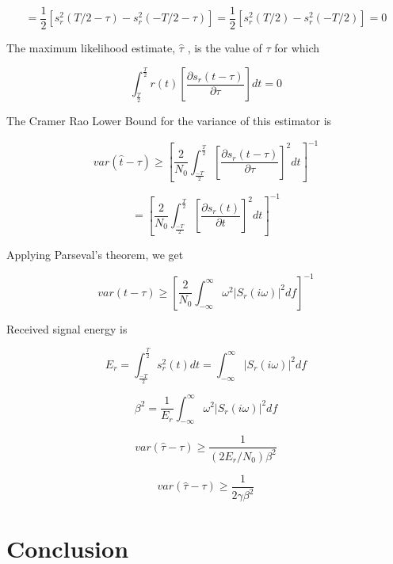 \documentclass[11pt]{article}
\begin{document}
\begin{equation}
=\frac{1}{2}[s_r^2(T/2-\tau) - s_r^2(-T/2-\tau)] = \frac{1}{2}[s_r^2(T/2) - s_r^2(-T/2)] = 0
\end{equation}

The maximum likelihood estimate, $\hat{\tau}$ , is the value of $\tau$ for which

\begin{equation}
\int^\frac{T}{2}_\frac{T}{2}
r(t)
\left[ \frac{\partial s_r(t-\tau)}{\partial \tau} \right] dt = 0
\end{equation}

The Cramer Rao Lower Bound for the variance of this estimator is

\begin{equation}
var(\hat{t} - \tau)
\geq
\left[
\frac{2}{N_0}
\int^\frac{T}{2}_\frac{-T}{2} \left[ \frac{\partial s_r(t-\tau)}{\partial \tau} \right]^2 dt \right]^{-1}
\end{equation}


\begin{equation}
= \left[ \frac{2}{N_0} \int^\frac{T}{2}_\frac{-T}{2} \left[ \frac{\partial s_r(t)}{\partial t} \right]^2 dt \right]^{-1}
\end{equation}

Applying Parseval's theorem, we get

\begin{equation}
var(t-\tau)
\geq
\left[ \frac{2}{N_0} \int^{\infty}_{-\infty} \omega^2 |S_r(i\omega )|^2 df \right]^{-1}
\end{equation}

Received signal energy is

\begin{equation}
E_r = \int^\frac{T}{2}_\frac{-T}{2} s_r^2(t)dt = \int^\infty_{-\infty} |S_r(i\omega)|^2 df
\end{equation}

\begin{equation}
\beta^2 = \frac{1}{E_r} \int^\infty_{-\infty} \omega^2 |S_r(i\omega)|^2 df
\end{equation}

\begin{equation}
var(\hat{\tau} - \tau)
\geq
\frac{1}{(2E_r/N_0)\beta^2}
\end{equation}


\begin{equation}
var(\hat{\tau} - \tau)
\geq
\frac{1}{2\gamma\beta^2}
\end{equation}


\section{Conclusion}
\end{document}
